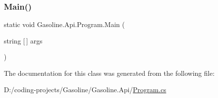 \subsubsection{\texorpdfstring{Main()}{Main()}}
{\footnotesize\ttfamily static void Gasoline.\+Api.\+Program.\+Main (\begin{DoxyParamCaption}\item[{string \mbox{[}$\,$\mbox{]}}]{args }\end{DoxyParamCaption})\hspace{0.3cm}{\ttfamily [static]}}



The documentation for this class was generated from the following file\+:\begin{DoxyCompactItemize}
\item 
D\+:/coding-\/projects/\+Gasoline/\+Gasoline.\+Api/\mbox{\hyperlink{_program_8cs}{Program.\+cs}}\end{DoxyCompactItemize}
